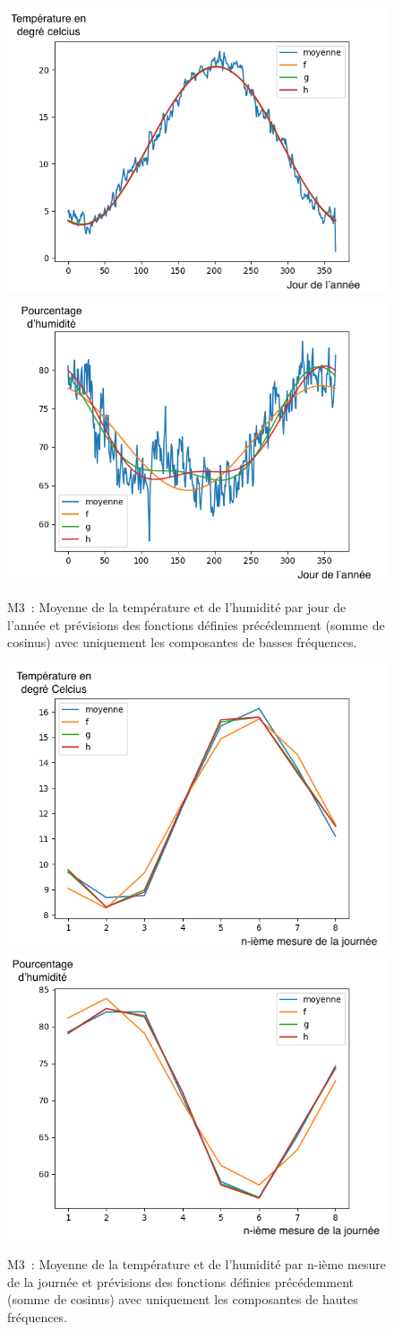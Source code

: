\documentclass[11pt,a4paper]{article}
\begin{document}
\begin{figure} [H]
\centering
\includegraphics[width=0.48 \textwidth]{imagesTIPE/CourbeAnneeT.png}\quad
\includegraphics[width=0.48 \textwidth]{imagesTIPE/CourbeAnneeH.png}
\caption{\label{fig:moyBassesFreq} M3~: Moyenne de la température et de l'humidité par jour de l'année et prévisions des fonctions définies précédemment (somme de cosinus) avec uniquement les composantes de basses fréquences.}
\end{figure}
\begin{figure} [H]
\centering
\includegraphics[width=0.48 \textwidth]{imagesTIPE/CourbeJourneeT.png}\quad
\includegraphics[width=0.48 \textwidth]{imagesTIPE/CourbeJourneeH.png}
\caption{\label{fig:moyHautesFreq} M3~: Moyenne de la température et de l'humidité par n-ième mesure de la journée et prévisions des fonctions définies précédemment (somme de cosinus) avec uniquement les composantes de hautes fréquences.}
\end{figure}
\end{document}
